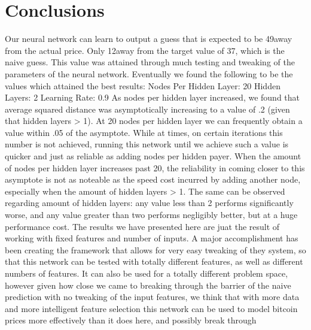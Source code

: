 \documentclass[a4paper,10pt]{article}
\begin{document}
\section{Conclusions}
Our neural network can learn to output a guess that is expected to be 49\cent away from the actual price.  Only 12\cent away from
the target value of 37\cent, which is the naive guess.  This value was attained through much testing and tweaking of the parameters
of the neural network.  Eventually we found the following to be the values which attained the best results:
\newline \newline Nodes Per Hidden Layer: 20
\newline \newline Hidden Layers: 2
\newline \newline Learning Rate: 0.9
\newline \newline
As nodes per hidden layer increased, we found that average squared distance was asymptotically increasing to a value of .2 (given
that hidden layers > 1).  At 20 nodes per hidden layer we can frequently obtain a value within .05 of the asymptote.  While at
times, on certain iterations this number is not achieved, running this network until we achieve such a value is quicker
and just as reliable as adding nodes per hidden payer.  When the amount of nodes per hidden layer increases past 20, the reliability
in coming closer to this asymptote is not as noteable as the speed cost incurred by adding another node, especially when the 
amount of hidden layers > 1.  
\newline \newline
The same can be observed regarding amount of hidden layers: any value less than 2 performs significantly worse, and any value greater
than two performs negligibly better, but at a huge performance cost.  The results we have presented here are juat the result of
working with fixed features and number of inputs.  A major accomplishment has been creating the framework that allows for very easy
tweaking of they system, so that this network can be tested with totally different features, as well as different numbers of 
features.  It can also be used for a totally different problem space, however given how close we came to breaking through the
barrier of the naive prediction with no tweaking of the input features, we think that with more data and more intelligent feature
selection this network can be used to model bitcoin prices more effectively than it does here, and possibly break through
\end{document}
